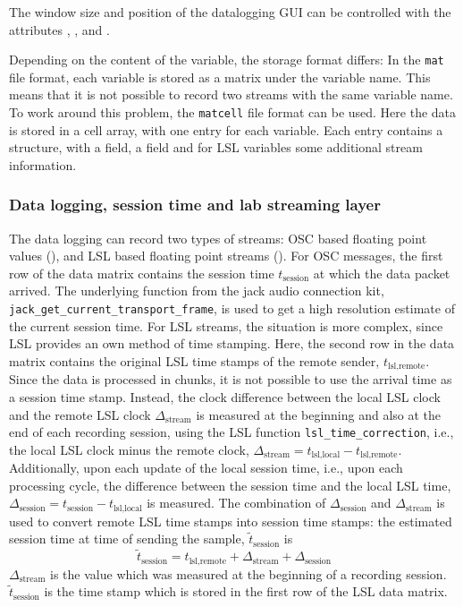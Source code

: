 The window size and position of the datalogging GUI can be controlled
with the attributes , ,  and .


Depending on the content of the  variable, the
storage format differs: In the \verb!mat! file format, each variable
is stored as a matrix under the variable name. This means that it is
not possible to record two streams with the same variable name. To
work around this problem, the \verb!matcell! file format can be
used. Here the data is stored in a cell array, with one entry for each
variable. Each entry contains a structure, with a  field,
a  field and for LSL variables some additional stream
information.

\subsubsection*{Data logging, session time and lab streaming layer}

The data logging can record two types of streams: OSC based floating
point values (), and LSL based floating point streams
().
%
For OSC messages, the first row of the data matrix contains the
session time $t_\text{session}$ at which the data packet arrived.
%
The underlying function from the jack audio connection kit,
\verb!jack_get_current_transport_frame!, is used to get a high
resolution estimate of the current session time.
%
For LSL streams, the situation is more complex, since LSL provides an
own method of time stamping.
%
Here, the second row in the data matrix contains the original LSL time
stamps of the remote sender, $t_\text{lsl,remote}$.
%
Since the data is processed in chunks, it is not possible to use the
arrival time as a session time stamp.
%
Instead, the clock difference between the local LSL clock and the
remote LSL clock $\Delta_\text{stream}$ is measured at the beginning
and also at the end of each recording session, using the LSL function
\verb!lsl_time_correction!, i.e., the local LSL clock minus the remote
clock, $\Delta_\text{stream}=t_\text{lsl,local}-t_\text{lsl,remote}$.
%
Additionally, upon each update of the local session time, i.e., upon
each processing cycle, the difference between the session time and the
local LSL time,
$\Delta_\text{session}=t_\text{session}-t_\text{lsl,local}$ is
measured.
%
The combination of $\Delta_\text{session}$ and $\Delta_\text{stream}$
is used to convert remote LSL time stamps into session time stamps: the estimated session time at time of sending the sample, $\tilde{t}_\text{session}$ is
\begin{equation}
\tilde{t}_\text{session} = t_\text{lsl,remote} + \Delta_\text{stream} + \Delta_\text{session}
\end{equation}
$\Delta_\text{stream}$ is the value which was measured at the
beginning of a recording session. $\tilde{t}_\text{session}$ is the
time stamp which is stored in the first row of the LSL data matrix.

